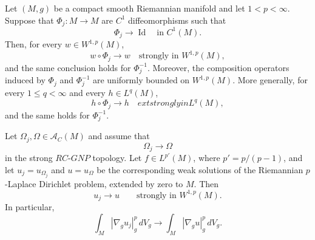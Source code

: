 \documentclass[10pt,a4paper]{amsart}
\begin{document}
\begin{lemma}
\label{lem:composition-C1-W1p}
Let $(M,g)$ be a compact smooth Riemannian manifold and let $1<p<\infty$. Suppose that $\Phi_j:M\to M$ are $C^1$ diffeomorphisms such that
\[
\Phi_j\to\operatorname{Id}\quad\text{in }C^1(M).
\]
Then, for every $w\in W^{1,p}(M)$,
\[
w\circ\Phi_j\to w\quad\text{strongly in }W^{1,p}(M),
\]
and the same conclusion holds for $\Phi_j^{-1}$. Moreover, the composition
operators induced by $\Phi_j$ and $\Phi_j^{-1}$ are uniformly bounded on
$W^{1,p}(M)$. More generally, for every $1\le q<\infty$ and every
$h\in L^q(M)$,
\[
h\circ\Phi_j\to h\quad	ext{strongly in }L^q(M),
\]
and the same holds for $\Phi_j^{-1}$.
\end{lemma}

\begin{theorem}
\label{thm:stability-p-laplace}
Let $\Omega_j,\Omega\in\mathcal A_C(M)$ and assume that
\[
\Omega_j\longrightarrow\Omega
\]
in the strong $RC$-$GNP$ topology. Let
$f\in L^{p'}(M)$, where $p'=p/(p-1)$, and let
$u_j=u_{\Omega_j}$ and $u=u_\Omega$ be the corresponding weak
solutions of the Riemannian $p$-Laplace Dirichlet problem, extended by
zero to $M$. Then
\[
u_j\longrightarrow u
\qquad\text{strongly in }W^{1,p}(M).
\]
In particular,
\[
\int_M|\nabla_g u_j|_g^p\,dV_g
\longrightarrow
\int_M|\nabla_g u|_g^p\,dV_g.
\]
\end{theorem}
\end{document}
